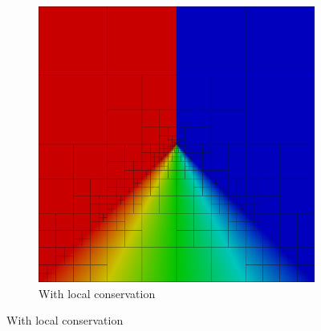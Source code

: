 \documentclass[mathserif]{beamer}
\begin{document}
\begin{frame}
{\begin{figure}
\begin{subfigure}[t]{0.45\textwidth}
\includegraphics[width=1.0\textwidth]{../figs/Burgers/graph8c.png}
\caption*{With local conservation}
\end{subfigure}
\end{figure}
}
\end{frame}

\end{document}
